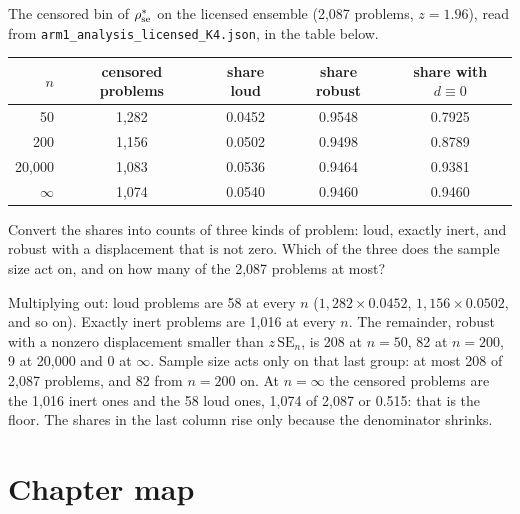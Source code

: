 \begin{exercicio}[metodo=table-reading,conceito=bola-inerte]
The censored bin of $\rho^{*}_{\mathrm{se}}$ on the licensed ensemble (2,087 problems, $z = 1.96$),
read from \texttt{arm1\_analysis\_licensed\_K4.json}, in the table below.

\smallskip
\begin{center}\small
\begin{tabular}{@{}rcccc@{}}
\toprule
$n$ & censored problems & share loud & share robust & share with $d \equiv 0$ \\
\midrule
50 & 1,282 & 0.0452 & 0.9548 & 0.7925 \\
200 & 1,156 & 0.0502 & 0.9498 & 0.8789 \\
20,000 & 1,083 & 0.0536 & 0.9464 & 0.9381 \\
$\infty$ & 1,074 & 0.0540 & 0.9460 & 0.9460 \\
\bottomrule
\end{tabular}
\end{center}
Convert the shares into counts of three kinds of problem: loud, exactly inert, and robust with a
displacement that is not zero. Which of the three does the sample size act on, and on how many of
the 2,087 problems at most?
\end{exercicio}
\begin{solucao}
Multiplying out: loud problems are 58 at every $n$ ($1{,}282 \times 0.0452$, $1{,}156 \times
0.0502$, and so on). Exactly inert problems are 1,016 at every $n$. The remainder, robust with a
nonzero displacement smaller than $z\,\mathrm{SE}_n$, is 208 at $n = 50$, 82 at $n = 200$, 9 at
20,000 and 0 at $\infty$. Sample size acts only on that last group: at most 208 of
2,087 problems, and 82 from $n = 200$ on. At $n = \infty$ the censored problems are the 1,016 inert
ones and the 58 loud ones, 1,074 of 2,087 or 0.515: that is the floor. The shares in the last
column rise only because the denominator shrinks.
\end{solucao}


\section*{Chapter map}

